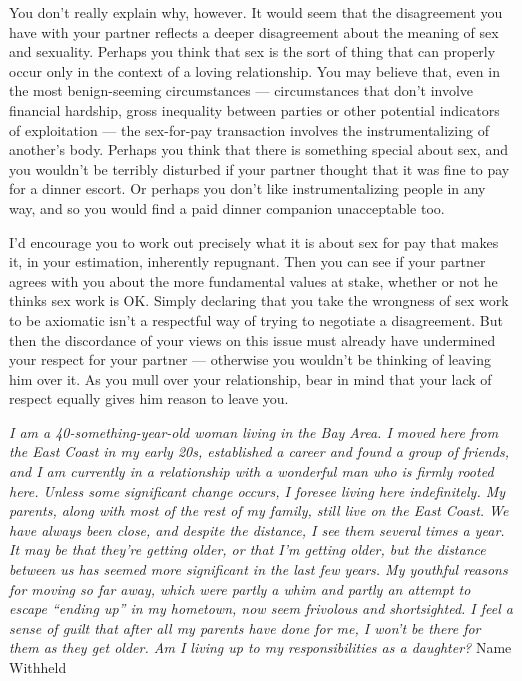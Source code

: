 You don't really explain why, however. It would seem that the
disagreement you have with your partner reflects a deeper disagreement
about the meaning of sex and sexuality. Perhaps you think that sex is
the sort of thing that can properly occur only in the context of a
loving relationship. You may believe that, even in the most
benign-seeming circumstances --- circumstances that don't involve
financial hardship, gross inequality between parties or other potential
indicators of exploitation --- the sex-for-pay transaction involves the
instrumentalizing of another's body. Perhaps you think that there is
something special about sex, and you wouldn't be terribly disturbed if
your partner thought that it was fine to pay for a dinner escort. Or
perhaps you don't like instrumentalizing people in any way, and so you
would find a paid dinner companion unacceptable too.

I'd encourage you to work out precisely what it is about sex for pay
that makes it, in your estimation, inherently repugnant. Then you can
see if your partner agrees with you about the more fundamental values at
stake, whether or not he thinks sex work is OK. Simply declaring that
you take the wrongness of sex work to be axiomatic isn't a respectful
way of trying to negotiate a disagreement. But then the discordance of
your views on this issue must already have undermined your respect for
your partner --- otherwise you wouldn't be thinking of leaving him over
it. As you mull over your relationship, bear in mind that your lack of
respect equally gives him reason to leave you.

\emph{I am a 40-something-year-old woman living in the Bay Area. I moved
here from the East Coast in my early 20s, established a career and found
a group of friends, and I am currently in a relationship with a
wonderful man who is firmly rooted here. Unless some significant change
occurs, I foresee living here indefinitely. My parents, along with most
of the rest of my family, still live on the East Coast. We have always
been close, and despite the distance, I see them several times a year.
It may be that they're getting older, or that I'm getting older, but the
distance between us has seemed more significant in the last few years.
My youthful reasons for moving so far away, which were partly a whim and
partly an attempt to escape ``ending up'' in my hometown, now seem
frivolous and shortsighted. I feel a sense of guilt that after all my
parents have done for me, I won't be there for them as they get older.
Am I living up to my responsibilities as a daughter?} Name Withheld

